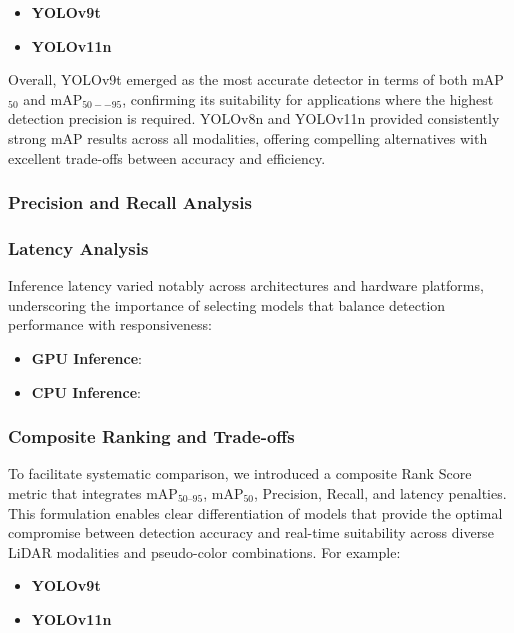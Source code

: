 \documentclass[runningheads]{llncs}
\begin{document}
\begin{itemize}
    \item \textbf{YOLOv9t} 
    
    \item \textbf{YOLOv11n} 
    

\end{itemize}

Overall, YOLOv9t emerged as the most accurate detector in terms of both mAP$_{50}$ and mAP$_{50--95}$, confirming its suitability for applications where the highest detection precision is required. YOLOv8n and YOLOv11n provided consistently strong mAP results across all modalities, offering compelling alternatives with excellent trade-offs between accuracy and efficiency.



\subsubsection{Precision and Recall Analysis}

\subsubsection{Latency Analysis}

Inference latency varied notably across architectures and hardware platforms, underscoring the importance of selecting models that balance detection performance with responsiveness:

\begin{itemize}
    \item \textbf{GPU Inference}: 
    
    \item \textbf{CPU Inference}: 
\end{itemize}

\subsubsection{Composite Ranking and Trade-offs}

To facilitate systematic comparison, we introduced a composite Rank Score metric that integrates mAP$_{50\text{--}95}$, mAP$_{50}$, Precision, Recall, and latency penalties. This formulation enables clear differentiation of models that provide the optimal compromise between detection accuracy and real-time suitability across diverse LiDAR modalities and pseudo-color combinations. For example:

\begin{itemize}
    \item \textbf{YOLOv9t}
    
    \item \textbf{YOLOv11n}

\end{itemize}
\end{document}
